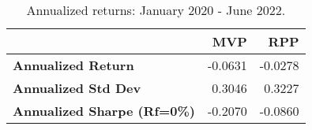 \begin{table}[!htb]
	\centering
	\begingroup
	\fontsize{9}{9}
	\selectfont
	\begin{tabular}{>{}lrr}
		\toprule
		                                    & MVP     & RPP     \\
		\midrule
		\textbf{Annualized Return}          & -0.0631 & -0.0278 \\
		\textbf{Annualized Std Dev}         & 0.3046  & 0.3227  \\
		\textbf{Annualized Sharpe (Rf=0\%)} & -0.2070 & -0.0860 \\
		\bottomrule
	\end{tabular}
	\caption{Annualized returns: January 2020 - June 2022.}
	\label{tab:RPP2}  %
	\endgroup{}
\end{table}